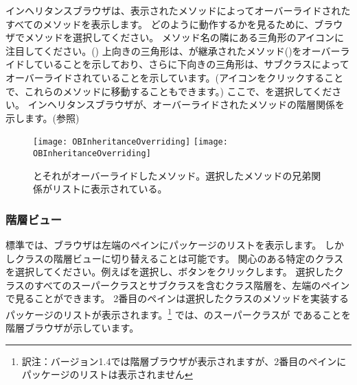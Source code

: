 \documentclass[a4paper,10pt,twoside]{book}
\begin{document}
インヘリタンスブラウザは、表示されたメソッドによってオーバーライドされたすべてのメソッドを表示します。
どのように動作するかを見るために、ブラウザでメソッドを選択してください。
メソッド名の隣にある三角形のアイコンに注目してください。()
上向きの三角形は、が継承されたメソッド(\ie {})をオーバーライドしていることを示しており、さらに下向きの三角形は、サブクラスによってオーバーライドされていることを示しています。(アイコンをクリックすることで、これらのメソッドに移動することもできます。)
ここで、を選択してください。
インヘリタンスブラウザが、オーバーライドされたメソッドの階層関係を示します。(参照)

\begin{figure}[btp]
\begin{center}
   \ifluluelse
{\texttt{[image: OBInheritanceOverriding]}}
{\texttt{[image: OBInheritanceOverriding]}}
\end{center}
\caption{ とそれがオーバーライドしたメソッド。選択したメソッドの兄弟関係がリストに表示されている。}
\end{figure}

\subsubsection{階層ビュー}

標準では、ブラウザは左端のペインにパッケージのリストを表示します。
しかしクラスの階層ビューに切り替えることは可能です。
関心のある特定のクラスを選択してください。例えばを選択し、ボタンをクリックします。
選択したクラスのすべてのスーパークラスとサブクラスを含むクラス階層を、左端のペインで見ることができます。
2番目のペインは選択したクラスのメソッドを実装するパッケージのリストが表示されます。\footnote{訳注：バージョン1.4では階層ブラウザが表示されますが、2番目のペインにパッケージのリストは表示されません}
では、のスーパークラスが であることを階層ブラウザが示しています。
\end{document}
